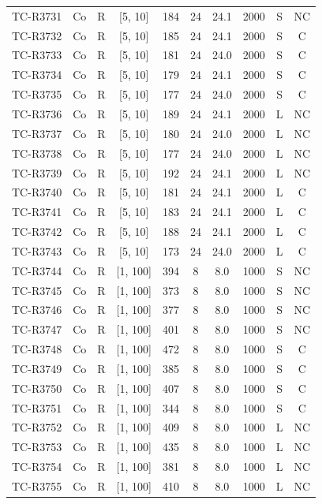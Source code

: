 \begin{longtable}{lccccccccc}
TC-R3731 & Co & R & [5, 10] & 184 & 24 & 24.1 & 2000 & S & NC \\
TC-R3732 & Co & R & [5, 10] & 185 & 24 & 24.1 & 2000 & S & C \\
TC-R3733 & Co & R & [5, 10] & 181 & 24 & 24.0 & 2000 & S & C \\
TC-R3734 & Co & R & [5, 10] & 179 & 24 & 24.1 & 2000 & S & C \\
TC-R3735 & Co & R & [5, 10] & 177 & 24 & 24.0 & 2000 & S & C \\
TC-R3736 & Co & R & [5, 10] & 189 & 24 & 24.1 & 2000 & L & NC \\
TC-R3737 & Co & R & [5, 10] & 180 & 24 & 24.0 & 2000 & L & NC \\
TC-R3738 & Co & R & [5, 10] & 177 & 24 & 24.0 & 2000 & L & NC \\
TC-R3739 & Co & R & [5, 10] & 192 & 24 & 24.1 & 2000 & L & NC \\
TC-R3740 & Co & R & [5, 10] & 181 & 24 & 24.1 & 2000 & L & C \\
TC-R3741 & Co & R & [5, 10] & 183 & 24 & 24.1 & 2000 & L & C \\
TC-R3742 & Co & R & [5, 10] & 188 & 24 & 24.1 & 2000 & L & C \\
TC-R3743 & Co & R & [5, 10] & 173 & 24 & 24.0 & 2000 & L & C \\
TC-R3744 & Co & R & [1, 100] & 394 & 8 & 8.0 & 1000 & S & NC \\
TC-R3745 & Co & R & [1, 100] & 373 & 8 & 8.0 & 1000 & S & NC \\
TC-R3746 & Co & R & [1, 100] & 377 & 8 & 8.0 & 1000 & S & NC \\
TC-R3747 & Co & R & [1, 100] & 401 & 8 & 8.0 & 1000 & S & NC \\
TC-R3748 & Co & R & [1, 100] & 472 & 8 & 8.0 & 1000 & S & C \\
TC-R3749 & Co & R & [1, 100] & 385 & 8 & 8.0 & 1000 & S & C \\
TC-R3750 & Co & R & [1, 100] & 407 & 8 & 8.0 & 1000 & S & C \\
TC-R3751 & Co & R & [1, 100] & 344 & 8 & 8.0 & 1000 & S & C \\
TC-R3752 & Co & R & [1, 100] & 409 & 8 & 8.0 & 1000 & L & NC \\
TC-R3753 & Co & R & [1, 100] & 435 & 8 & 8.0 & 1000 & L & NC \\
TC-R3754 & Co & R & [1, 100] & 381 & 8 & 8.0 & 1000 & L & NC \\
TC-R3755 & Co & R & [1, 100] & 410 & 8 & 8.0 & 1000 & L & NC \\

\end{longtable}
